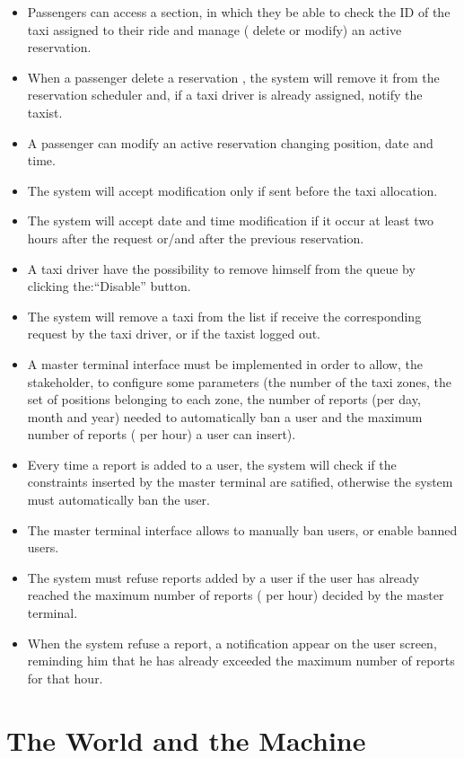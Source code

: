 \begin{itemize}
 \item Passengers can access a section, in which they be able to check the ID of the taxi assigned to their ride 
 and manage ( delete or modify) an active reservation.
 \item When a passenger delete a reservation , the system will remove it from the reservation scheduler and, if a taxi 
 driver is already assigned, notify the taxist.
 \item A passenger can modify an active reservation changing position, date and time.
 \item The system will accept modification only if sent before the taxi allocation.
 \item The system will accept date and time modification if it occur at least two hours after the request or/and after the 
 previous reservation.
 \item A taxi driver have the possibility to remove himself from the queue by clicking the:``Disable'' button.
 \item The system will remove a taxi from the list if receive the corresponding request by the taxi driver, or if the taxist logged out.
 \item A master terminal interface must be implemented in order to allow, the stakeholder, to configure some parameters 
 (the number of the taxi zones, the set of positions belonging to each zone, the number of reports (per day, month and year)
  needed to automatically ban a user and the maximum number of reports ( per hour) a user can insert).
 \item Every time a report is added to a user, the system will check if the constraints inserted by the master terminal are satified,
 otherwise the system must automatically ban the user.
 \item The master terminal interface allows to manually ban users, or enable banned users.
 \item The system must refuse reports added by a user if the user has already reached the maximum number of reports ( per hour) decided
 by the master terminal.
 \item When the system refuse a report, a notification appear on the user screen, reminding him that he has already exceeded
 the maximum number of reports for that hour.
 \end{itemize}
 
\section{The World and the Machine}

